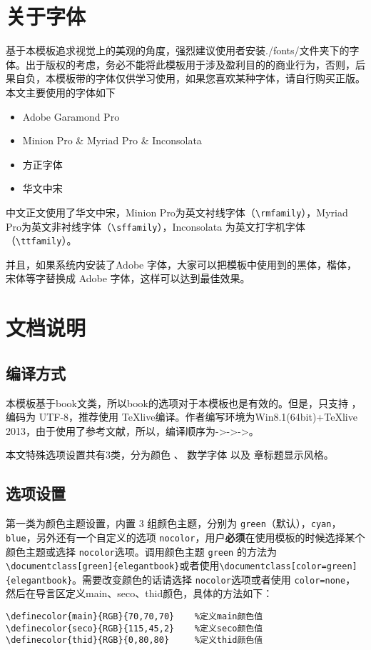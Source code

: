 \documentclass[color=green,mathpazo,titlestyle=hang,11pt]{elegantbook}
\begin{document}
\section{关于字体}

基于本模板追求视觉上的美观的角度，强烈建议使用者安装./fonts/文件夹下的字体。出于版权的考虑，务必不能将此模板用于涉及盈利目的的商业行为，否则，后果自负，本模板带的字体仅供学习使用，如果您喜欢某种字体，请自行购买正版。本文主要使用的字体如下
\begin{itemize}
\itemsep=3pt
\parskip=0pt
\item Adobe Garamond Pro
\item Minion Pro \& Myriad Pro  \& Inconsolata
\item 方正字体
\item 华文中宋
\end{itemize}

\begin{note}
中文正文使用了华文中宋，Minion Pro为英文衬线字体（\verb|\rmfamily|），Myriad Pro为英文非衬线字体（\verb|\sffamily|），Inconsolata 为英文打字机字体（\verb|\ttfamily|）。

并且，如果系统内安装了Adobe 字体，大家可以把模板中使用到的黑体，楷体，宋体等字替换成 Adobe 字体，这样可以达到最佳效果。
\end{note}

\section{文档说明}
\subsection{编译方式}
本模板基于book文类，所以book的选项对于本模板也是有效的。但是，只支持 \XeLaTeX{}，编码为 UTF-8，推荐使用 \TeX{}live编译。作者编写环境为Win8.1(64bit)+\TeX{}live 2013，由于使用了参考文献，所以，编译顺序为\XeLaTeX->\BibTeX->\XeLaTeX->\XeLaTeX。

本文特殊选项设置共有3类，分为{\color{main}颜色} 、{\color{main} 数学字体 }以及{\color{main} 章标题显示风格}。

\subsection{选项设置}
第一类为{\color{main}颜色}主题设置，内置 3 组颜色主题，分别为 \verb|green|（默认），\verb|cyan|，\verb|blue|，另外还有一个自定义的选项 \verb|nocolor|，用户\textbf{必须}在使用模板的时候选择某个颜色主题或选择 \verb|nocolor|选项。调用颜色主题 \verb|green| 的方法为\verb|\documentclass[green]{elegantbook}|或者使用\verb|\documentclass[color=green]{elegantbook}|。需要改变颜色的话请选择 \verb|nocolor|选项或者使用 \verb|color=none|，然后在导言区定义main、seco、thid颜色，具体的方法如下：
\begin{verbatim}
\definecolor{main}{RGB}{70,70,70}    %定义main颜色值
\definecolor{seco}{RGB}{115,45,2}    %定义seco颜色值
\definecolor{thid}{RGB}{0,80,80}     %定义thid颜色值
\end{verbatim}
\end{document}
